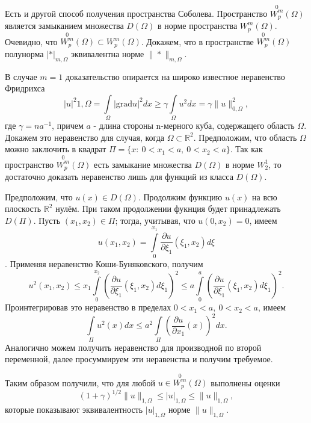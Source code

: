 \documentclass[9pt]{article}
\begin{document}
	Есть и другой способ получения пространства Соболева. Пространство $\stackrel{0}{W_p^m}(\Omega)$ является замыканием множества $D(\Omega)$ в норме пространства $W_p^m(\Omega)$. Очевидно, что $\stackrel{0}{W_p^m}(\Omega)\subset W_p^m(\Omega)$. Докажем, что в пространстве $\stackrel{0}{W_p^m}(\Omega)$ полунорма $|*|_{m, \Omega}$ эквивалентна норме $\|* \|_{m, \Omega}$.
	
	В случае $m=1$ доказательство опирается на широко известное неравенство Фридрихса
	\begin{equation*}
		|u|^2{1,\Omega} = \int\limits_{\Omega} |\mathrm{grad} u|^2 dx \geq \gamma \int\limits_{\Omega} u^2 dx  = \gamma \|u\|^2_{0,\Omega}, 
	\end{equation*}
	где $\gamma = n a^{-1}$, причем $a$ - длина стороны n-мерного куба, содержащего область $\Omega$. Докажем это неравенство для случая, когда $\Omega \subset \mathbb{R}^2$. Предположим, что область $\Omega$ можно заключить в квадрат $\Pi = \{x: \ 0 < x_1 < a, \ 0 < x_2 < a\}$. Так как пространство $\stackrel{0}{W_p^m}(\Omega)$ есть замыкание множества $D(\Omega)$ в норме $W^1_2$, то достаточно доказать неравенство лишь для функций из класса $D(\Omega)$.
	
	Предположим, что $u(x) \in D(\Omega)$. Продолжим функцию $u(x)$ на всю плоскость $\mathbb{R}^2$ нулём. При таком продолжении фукнция будет принадлежать $D(\Pi)$. Пусть $(x_1, x_2) \in \Pi$; тогда, учитывая, что $u(0, x_2) = 0$, имеем
	$$
	u(x_1, x_2) = \int\limits_0^{x_1} \dfrac{\partial u}{\partial \xi_1}(\xi_1, x_2) d\xi
	$$.
	Применяя неравенство Коши-Буняковского, получим
	$$
	u^2(x_1, x_2) \leq x_1 \int\limits_0^{x_2} \left(\dfrac{\partial u}{\partial \xi_1}(\xi_1, x_2) d\xi_1\right)^2 \leq a \int\limits_0^a  \left(\dfrac{\partial u}{\partial \xi_1}(\xi_1, x_2) d\xi_1\right)^2.
	$$
	Проинтегрировав это неравенство в пределах $0 < x_1 < a, \ 0 < x_2 < a$, имеем 
	$$
		\int\limits_{\Pi} u^2(x) dx \leq a^2 \int\limits_{\Pi} \left(\dfrac{\partial u}{\partial x_1}(x)\right)^2dx.
	$$
	Аналогично можем получить неравенство для производной по второй переменной, далее просуммируем эти неравенства  и получим требуемое.
	
	Таким образом получили, что для любой $u \in \stackrel{0}{W_p^m}(\Omega)$ выполнены оценки
	\begin{equation*}
		(1 + \gamma)^{1/2} \|u\|_{1, \Omega} \leq |u|_{1, \Omega} \leq \|u\|_{1, \Omega},
	\end{equation*}
	которые показывают эквивалентность $|u|_{1, \Omega}$ норме $\|u\|_{1,\Omega}$.
	
\end{document}
